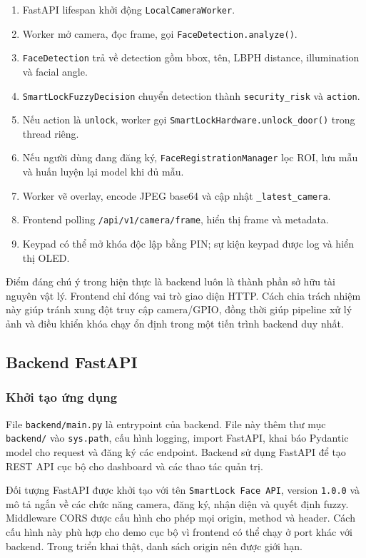 \begin{enumerate}
    \item FastAPI lifespan khởi động \texttt{LocalCameraWorker}.
    \item Worker mở camera, đọc frame, gọi \texttt{FaceDetection.analyze()}.
    \item \texttt{FaceDetection} trả về detection gồm bbox, tên, LBPH distance, illumination và facial angle.
    \item \texttt{SmartLockFuzzyDecision} chuyển detection thành \texttt{security\_risk} và \texttt{action}.
    \item Nếu action là \texttt{unlock}, worker gọi \texttt{SmartLockHardware.unlock\_door()} trong thread riêng.
    \item Nếu người dùng đang đăng ký, \texttt{FaceRegistrationManager} lọc ROI, lưu mẫu và huấn luyện lại model khi đủ mẫu.
    \item Worker vẽ overlay, encode JPEG base64 và cập nhật \texttt{\_latest\_camera}.
    \item Frontend polling \texttt{/api/v1/camera/frame}, hiển thị frame và metadata.
    \item Keypad có thể mở khóa độc lập bằng PIN; sự kiện keypad được log và hiển thị OLED.
\end{enumerate}

Điểm đáng chú ý trong hiện thực là backend luôn là thành phần sở hữu tài nguyên vật lý. Frontend chỉ đóng vai trò giao diện HTTP. Cách chia trách nhiệm này giúp tránh xung đột truy cập camera/GPIO, đồng thời giúp pipeline xử lý ảnh và điều khiển khóa chạy ổn định trong một tiến trình backend duy nhất.

\subsection{Backend FastAPI}

\subsubsection{Khởi tạo ứng dụng}

File \texttt{backend/main.py} là entrypoint của backend. File này thêm thư mục \texttt{backend/} vào \texttt{sys.path}, cấu hình logging, import FastAPI, khai báo Pydantic model cho request và đăng ký các endpoint. Backend sử dụng FastAPI \cite{fastapi} để tạo REST API cục bộ cho dashboard và các thao tác quản trị.

Đối tượng FastAPI được khởi tạo với tên \texttt{SmartLock Face API}, version \texttt{1.0.0} và mô tả ngắn về các chức năng camera, đăng ký, nhận diện và quyết định fuzzy. Middleware CORS được cấu hình cho phép mọi origin, method và header. Cách cấu hình này phù hợp cho demo cục bộ vì frontend có thể chạy ở port khác với backend. Trong triển khai thật, danh sách origin nên được giới hạn.

